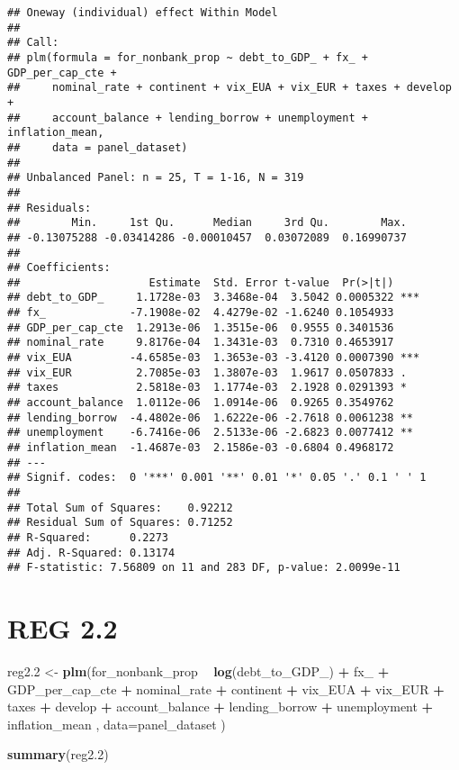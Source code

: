 \documentclass[]{article}
\newenvironment{Shaded}{\begin{snugshade}}{\end{snugshade}}
\newcommand{\KeywordTok}[1]{\textcolor[rgb]{0.13,0.29,0.53}{\textbf{#1}}}
\newcommand{\DataTypeTok}[1]{\textcolor[rgb]{0.13,0.29,0.53}{#1}}
\newcommand{\DecValTok}[1]{\textcolor[rgb]{0.00,0.00,0.81}{#1}}
\newcommand{\StringTok}[1]{\textcolor[rgb]{0.31,0.60,0.02}{#1}}
\newcommand{\OperatorTok}[1]{\textcolor[rgb]{0.81,0.36,0.00}{\textbf{#1}}}
\newcommand{\NormalTok}[1]{#1}
\begin{document}
\begin{verbatim}
## Oneway (individual) effect Within Model
## 
## Call:
## plm(formula = for_nonbank_prop ~ debt_to_GDP_ + fx_ + GDP_per_cap_cte + 
##     nominal_rate + continent + vix_EUA + vix_EUR + taxes + develop + 
##     account_balance + lending_borrow + unemployment + inflation_mean, 
##     data = panel_dataset)
## 
## Unbalanced Panel: n = 25, T = 1-16, N = 319
## 
## Residuals:
##        Min.     1st Qu.      Median     3rd Qu.        Max. 
## -0.13075288 -0.03414286 -0.00010457  0.03072089  0.16990737 
## 
## Coefficients:
##                    Estimate  Std. Error t-value  Pr(>|t|)    
## debt_to_GDP_     1.1728e-03  3.3468e-04  3.5042 0.0005322 ***
## fx_             -7.1908e-02  4.4279e-02 -1.6240 0.1054933    
## GDP_per_cap_cte  1.2913e-06  1.3515e-06  0.9555 0.3401536    
## nominal_rate     9.8176e-04  1.3431e-03  0.7310 0.4653917    
## vix_EUA         -4.6585e-03  1.3653e-03 -3.4120 0.0007390 ***
## vix_EUR          2.7085e-03  1.3807e-03  1.9617 0.0507833 .  
## taxes            2.5818e-03  1.1774e-03  2.1928 0.0291393 *  
## account_balance  1.0112e-06  1.0914e-06  0.9265 0.3549762    
## lending_borrow  -4.4802e-06  1.6222e-06 -2.7618 0.0061238 ** 
## unemployment    -6.7416e-06  2.5133e-06 -2.6823 0.0077412 ** 
## inflation_mean  -1.4687e-03  2.1586e-03 -0.6804 0.4968172    
## ---
## Signif. codes:  0 '***' 0.001 '**' 0.01 '*' 0.05 '.' 0.1 ' ' 1
## 
## Total Sum of Squares:    0.92212
## Residual Sum of Squares: 0.71252
## R-Squared:      0.2273
## Adj. R-Squared: 0.13174
## F-statistic: 7.56809 on 11 and 283 DF, p-value: 2.0099e-11
\end{verbatim}

\section{REG 2.2}\label{reg-2.2}

\begin{Shaded}
\begin{Highlighting}[]
\NormalTok{reg2.}\DecValTok{2}\NormalTok{ <-}\StringTok{ }\KeywordTok{plm}\NormalTok{(for_nonbank_prop }\OperatorTok{~}\StringTok{  }\KeywordTok{log}\NormalTok{(debt_to_GDP_) }\OperatorTok{+}\StringTok{ }\NormalTok{fx_ }\OperatorTok{+}\StringTok{ }\NormalTok{GDP_per_cap_cte }\OperatorTok{+}\StringTok{  }\NormalTok{nominal_rate }\OperatorTok{+}\StringTok{ }\NormalTok{continent }\OperatorTok{+}\StringTok{ }\NormalTok{vix_EUA }\OperatorTok{+}\StringTok{ }\NormalTok{vix_EUR }\OperatorTok{+}\StringTok{ }\NormalTok{taxes }\OperatorTok{+}\StringTok{ }\NormalTok{develop }\OperatorTok{+}\StringTok{ }\NormalTok{account_balance }\OperatorTok{+}\StringTok{ }\NormalTok{lending_borrow }\OperatorTok{+}\StringTok{ }\NormalTok{unemployment }\OperatorTok{+}\StringTok{ }\NormalTok{inflation_mean , }\DataTypeTok{data=}\NormalTok{panel_dataset  )}

\KeywordTok{summary}\NormalTok{(reg2.}\DecValTok{2}\NormalTok{)}
\end{Highlighting}
\end{Shaded}
\end{document}
